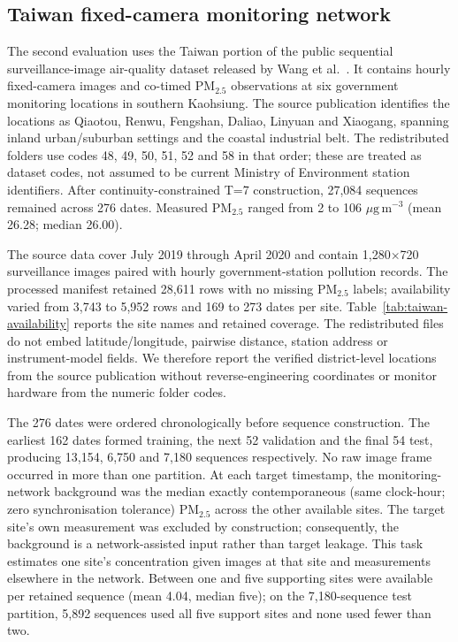 \documentclass[review,12pt,authoryear]{elsarticle}
\newcommand{\PM}[1]{\ensuremath{\mathrm{PM}_{#1}}}
\newcommand{\pmfine}{\PM{2.5}}
\newcommand{\ugm}{\ensuremath{\mu\mathrm{g}\,\mathrm{m}^{-3}}}
\begin{document}
\subsection{Taiwan fixed-camera monitoring network}

The second evaluation uses the Taiwan portion of the public sequential
surveillance-image air-quality dataset released by Wang et
al.~\citep{wang2026unified}. It contains hourly fixed-camera images and co-timed
\pmfine{} observations at six government monitoring locations in southern
Kaohsiung. The source publication identifies the locations as Qiaotou, Renwu,
Fengshan, Daliao, Linyuan and Xiaogang, spanning inland urban/suburban settings
and the coastal industrial belt. The redistributed folders use codes 48, 49,
50, 51, 52 and 58 in that order; these are treated as dataset codes, not assumed
to be current Ministry of Environment station identifiers. After continuity-constrained
T=7 construction, 27,084 sequences remained across 276 dates. Measured
\pmfine{} ranged from 2 to 106 \ugm{} (mean 26.28; median 26.00).

The source data cover July 2019 through April 2020 and contain
1,280$\times$720 surveillance images paired with hourly government-station
pollution records. The processed manifest retained 28,611 rows with no missing
\pmfine{} labels; availability varied from 3,743 to 5,952 rows and 169 to 273
dates per site. Table~\ref{tab:taiwan-availability} reports the site names and
retained coverage. The redistributed files do not embed latitude/longitude,
pairwise distance, station address or instrument-model fields. We therefore
report the verified district-level locations from the source publication
without reverse-engineering coordinates or monitor hardware from the numeric
folder codes.

The 276 dates were ordered chronologically before sequence construction. The
earliest 162 dates formed training, the next 52 validation and the final 54
test, producing 13,154, 6,750 and 7,180 sequences respectively. No raw image
frame occurred in more than one partition. At each target timestamp, the
monitoring-network background was the median exactly contemporaneous
(same clock-hour; zero synchronisation tolerance) \pmfine{} across
the other available sites. The target site's own measurement was excluded by
construction; consequently, the background is a network-assisted
input rather than target leakage. This task estimates one site's concentration
given images at that site and measurements elsewhere in the network. Between
one and five supporting sites were available per retained sequence (mean 4.04,
median five); on the 7,180-sequence test partition, 5,892 sequences used all
five support sites and none used fewer than two.
\end{document}
